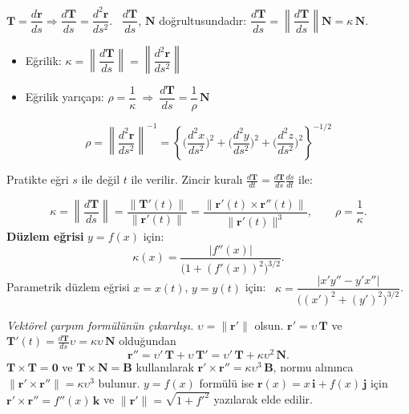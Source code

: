 \begin{tahta}
$\mathbf T=\dfrac{d\mathbf r}{ds}\Rightarrow\dfrac{d\mathbf T}{ds}=\dfrac{d^2\mathbf r}{ds^2}$. \ $\dfrac{d\mathbf T}{ds}$, $\mathbf N$
doğrultusundadır: $\dfrac{d\mathbf T}{ds}=\left\|\dfrac{d\mathbf T}{ds}\right\|\mathbf N=\kappa\,\mathbf N$.
\begin{itemize}
\item Eğrilik: $\kappa=\left\|\dfrac{d\mathbf T}{ds}\right\|=\left\|\dfrac{d^2\mathbf r}{ds^2}\right\|$
\item Eğrilik yarıçapı: $\rho=\dfrac1\kappa\ \Rightarrow\ \dfrac{d\mathbf T}{ds}=\dfrac1\rho\,\mathbf N$
\end{itemize}
\[ \rho=\left\|\frac{d^2\mathbf r}{ds^2}\right\|^{-1}=\left\{\Big(\frac{d^2x}{ds^2}\Big)^2+\Big(\frac{d^2y}{ds^2}\Big)^2+\Big(\frac{d^2z}{ds^2}\Big)^2\right\}^{-1/2} \]
\end{tahta}

Pratikte eğri $s$ ile değil $t$ ile verilir. Zincir kuralı $\frac{d\mathbf T}{dt}=\frac{d\mathbf T}{ds}\frac{ds}{dt}$ ile:

\begin{teorem}
\[ \kappa=\left\|\frac{d\mathbf T}{ds}\right\|=\frac{\|\mathbf T'(t)\|}{\|\mathbf r'(t)\|}=\frac{\|\mathbf r'(t)\times\mathbf r''(t)\|}{\|\mathbf r'(t)\|^3},\qquad \rho=\frac1\kappa . \]
\textbf{Düzlem eğrisi} $y=f(x)$ için:
\[ \kappa(x)=\frac{|f''(x)|}{\big(1+(f'(x))^2\big)^{3/2}} . \]
Parametrik düzlem eğrisi $x=x(t)$, $y=y(t)$ için: \ $\kappa=\dfrac{|x'y''-y'x''|}{\big((x')^2+(y')^2\big)^{3/2}}$.
\end{teorem}

\textit{Vektörel çarpım formülünün çıkarılışı.} $\upsilon=\|\mathbf r'\|$ olsun. $\mathbf r'=\upsilon\,\mathbf T$ ve
$\mathbf T'(t)=\frac{d\mathbf T}{ds}\upsilon=\kappa\upsilon\,\mathbf N$ olduğundan
\[ \mathbf r''=\upsilon'\,\mathbf T+\upsilon\,\mathbf T'=\upsilon'\,\mathbf T+\kappa\upsilon^2\,\mathbf N . \]
$\mathbf T\times\mathbf T=\mathbf 0$ ve $\mathbf T\times\mathbf N=\mathbf B$ kullanılarak
$\mathbf r'\times\mathbf r''=\kappa\upsilon^3\,\mathbf B$, normu alınınca $\|\mathbf r'\times\mathbf r''\|=\kappa\upsilon^3$ bulunur.
$y=f(x)$ formülü ise $\mathbf r(x)=x\,\mathbf i+f(x)\,\mathbf j$ için $\mathbf r'\times\mathbf r''=f''(x)\,\mathbf k$ ve
$\|\mathbf r'\|=\sqrt{1+f'^2}$ yazılarak elde edilir.


